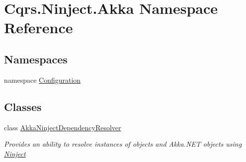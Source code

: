 \hypertarget{namespaceCqrs_1_1Ninject_1_1Akka}{}\section{Cqrs.\+Ninject.\+Akka Namespace Reference}
\label{namespaceCqrs_1_1Ninject_1_1Akka}
\subsection*{Namespaces}
\begin{DoxyCompactItemize}
\item 
namespace \hyperlink{namespaceCqrs_1_1Ninject_1_1Akka_1_1Configuration}{Configuration}
\end{DoxyCompactItemize}
\subsection*{Classes}
\begin{DoxyCompactItemize}
\item 
class \hyperlink{classCqrs_1_1Ninject_1_1Akka_1_1AkkaNinjectDependencyResolver}{Akka\+Ninject\+Dependency\+Resolver}
\begin{DoxyCompactList}\small\item\em Provides an ability to resolve instances of objects and Akka.\+N\+ET objects using \hyperlink{namespaceCqrs_1_1Ninject}{Ninject} \end{DoxyCompactList}\end{DoxyCompactItemize}
